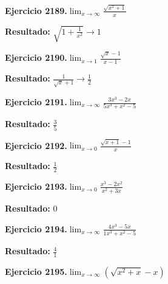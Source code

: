 \documentclass[10pt,a4paper]{article}
\begin{document}
\newpage
\begin{ejbox}
\textbf{Ejercicio 2189.}\quad $\lim_{x\to \infty} \frac{\sqrt{x^2+1}}{x}$
\end{ejbox}

\begin{solbox}
\textbf{Resultado:} \(\displaystyle \sqrt{1+\frac{1}{x^2}} \to 1\)
\end{solbox}

\begin{ejbox}
\textbf{Ejercicio 2190.}\quad $\lim_{x\to 1} \frac{\sqrt{x}-1}{x-1}$
\end{ejbox}

\begin{solbox}
\textbf{Resultado:} \(\displaystyle \frac{1}{\sqrt{x}+1} \to \frac{1}{2}\)
\end{solbox}

\begin{ejbox}
\textbf{Ejercicio 2191.}\quad $\lim_{x\to \infty} \frac{3x^3 - 2x}{5x^3 + x^2 - 5}$
\end{ejbox}

\begin{solbox}
\textbf{Resultado:} \(\displaystyle \frac{3}{5}\)
\end{solbox}

\newpage
\begin{ejbox}
\textbf{Ejercicio 2192.}\quad $\lim_{x\to 0} \frac{\sqrt{x+1}-1}{x}$
\end{ejbox}

\begin{solbox}
\textbf{Resultado:} \(\displaystyle \frac{1}{2}\)
\end{solbox}

\begin{ejbox}
\textbf{Ejercicio 2193.}\quad $\lim_{x\to 0} \frac{x^3-2x^2}{x^2+3x}$
\end{ejbox}

\begin{solbox}
\textbf{Resultado:} \(\displaystyle 0\)
\end{solbox}

\begin{ejbox}
\textbf{Ejercicio 2194.}\quad $\lim_{x\to \infty} \frac{4x^3 - 5x}{1x^3 + x^2 - 5}$
\end{ejbox}

\begin{solbox}
\textbf{Resultado:} \(\displaystyle \frac{4}{1}\)
\end{solbox}

\newpage
\begin{ejbox}
\textbf{Ejercicio 2195.}\quad $\lim_{x\to \infty} (\sqrt{x^2+x} - x)$
\end{ejbox}
\end{document}
